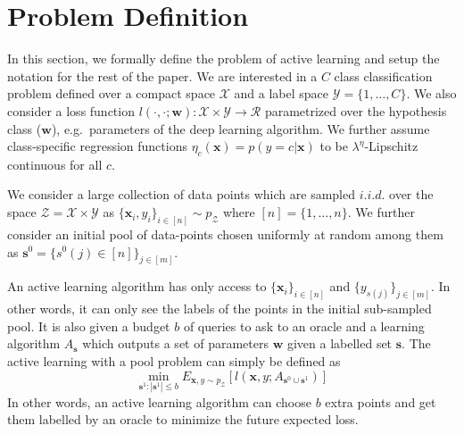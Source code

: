 \documentclass{article}
\begin{document}
\section{Problem Definition}
In this section, we formally define the problem of active learning and setup the notation for the rest of the paper. We are interested in a $C$ class classification problem defined over a compact space $\mathcal{X}$ and a label space  $\mathcal{Y}=\{1,\ldots,C\}$. We also consider a loss function $l(\cdot,\cdot;\mathbf{w}):\mathcal{X}\times \mathcal{Y} \rightarrow \mathcal{R}$ parametrized over the hypothesis class ($\mathbf{w}$), e.g.\ parameters of the deep learning algorithm. We further assume class-specific regression functions $\eta_c(\mathbf{x})=p(y=c|\mathbf{x})$ to be \mbox{$\lambda^\eta$-Lipschitz} continuous for all $c$.

We consider a large collection of data points which are sampled $i.i.d.$ over the space  $\mathcal{Z}=\mathcal{X}\times\mathcal{Y}$ as \mbox{$\{\mathbf{x}_i,y_i\}_{i \in [n]} \sim p_\mathcal{Z}$} where $[n]=\{1,\ldots,n\}$. We further consider an initial pool of data-points chosen uniformly at random among them as \mbox{$\mathbf{s}^0=\{s^0(j) \in [n]\}_{j \in [m]}$}.

An active learning algorithm has only access to $\{\mathbf{x}_i\}_{i \in [n]}$ and $\{y_{s(j)}\}_{j \in [m] }$. In other words, it can only see the labels of the points in the initial sub-sampled pool. It is also given a budget $b$ of queries to ask to an oracle and a learning algorithm $A_{\mathbf{s}}$ which outputs a set of parameters $\mathbf{w}$ given a labelled set $\mathbf{s}$. The active learning with a pool problem can simply be defined as
\begin{equation}
\min_{\mathbf{s}^1 : |\mathbf{s}^1| \leq b} E_{\mathbf{x},y \sim p_\mathcal{Z}} [l(\mathbf{x},y; A_{\mathbf{s}^0 \cup \mathbf{s}^1})]
\end{equation}
In other words, an active learning algorithm can choose $b$ extra points and get them labelled by an oracle to minimize the future expected loss.
\end{document}
